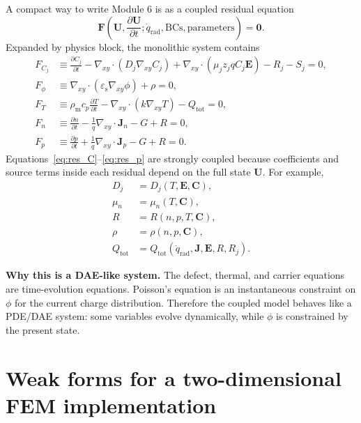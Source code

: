 \documentclass[11pt]{article}
\newcommand{\Evec}{\bm{E}}
\newcommand{\Jvec}{\bm{J}}
\newcommand{\Cvec}{\bm{C}}
\newcommand{\Uvec}{\bm{U}}
\newcommand{\Fvec}{\bm{F}}
\newcommand{\gradxy}{\nabla_{xy}}
\newcommand{\divxy}{\nabla_{xy}\cdot}
\newcommand{\epss}{\varepsilon_{\mathrm{s}}}
\newcommand{\rhom}{\rho_{\mathrm{m}}}
\newcommand{\cpsym}{c_{p}}
\begin{document}
A compact way to write Module 6 is as a coupled residual equation
\begin{equation}
\boxed{
\Fvec\left(\Uvec,\frac{\partial\Uvec}{\partial t};\dot{q}_{\mathrm{rad}},\mathrm{BCs},\mathrm{parameters}\right)=\bm{0}.}
\label{eq:monolithic_residual}
\end{equation}
Expanded by physics block, the monolithic system contains
\begin{align}
F_{C_j} &\equiv
\frac{\partial C_j}{\partial t}
-
\divxy\left(D_j\gradxy C_j\right)
+
\divxy\left(\mu_j z_j q C_j\Evec\right)
-R_j-S_j=0,
\label{eq:res_C}\\
F_{\phi} &\equiv
\divxy\left(\epss\gradxy\phi\right)+\rho=0,
\label{eq:res_phi}\\
F_T &\equiv
\rhom\cpsym\frac{\partial T}{\partial t}
-
\divxy\left(k\gradxy T\right)
-Q_{\mathrm{tot}}=0,
\label{eq:res_T}\\
F_n &\equiv
\frac{\partial n}{\partial t}
-
\frac{1}{q}\divxy\Jvec_n
-G+R=0,
\label{eq:res_n}\\
F_p &\equiv
\frac{\partial p}{\partial t}
+
\frac{1}{q}\divxy\Jvec_p
-G+R=0.
\label{eq:res_p}
\end{align}
Equations~\eqref{eq:res_C}--\eqref{eq:res_p} are strongly coupled because coefficients and source terms inside each residual depend on the full state \(\Uvec\). For example,
\begin{align}
D_j &= D_j(T,\Evec,\Cvec), \\
\mu_n &= \mu_n(T,\Cvec), \\
R &= R(n,p,T,\Cvec), \\
\rho &= \rho(n,p,\Cvec), \\
Q_{\mathrm{tot}} &= Q_{\mathrm{tot}}(\dot{q}_{\mathrm{rad}},\Jvec,\Evec,R,R_j).
\end{align}

\begin{notebox}
\textbf{Why this is a DAE-like system.} The defect, thermal, and carrier equations are time-evolution equations. Poisson's equation is an instantaneous constraint on \(\phi\) for the current charge distribution. Therefore the coupled model behaves like a PDE/DAE system: some variables evolve dynamically, while \(\phi\) is constrained by the present state.
\end{notebox}

\section{Weak forms for a two-dimensional FEM implementation}
\end{document}
